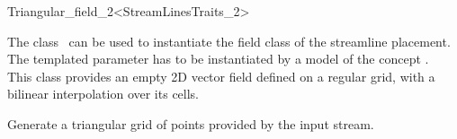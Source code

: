 

\begin{ccRefClass}{Triangular_field_2<StreamLinesTraits_2>}  %

\ccDefinition
  
The class \ccRefName\ can be used to instantiate the field class of
the streamline placement.  The templated parameter  has to be
instantiated by a model of the concept .\\
This class provides an empty 2D vector field defined on a regular
grid, with a bilinear interpolation over its cells.

\ccCreation
{}  %


\ccThreeToTwo
{}
{Generate a triangular grid of points provided by the input stream\ccVar.}


\ccIsModel 

 \\


\ccSeeAlso
{} \\
\end{ccRefClass}


